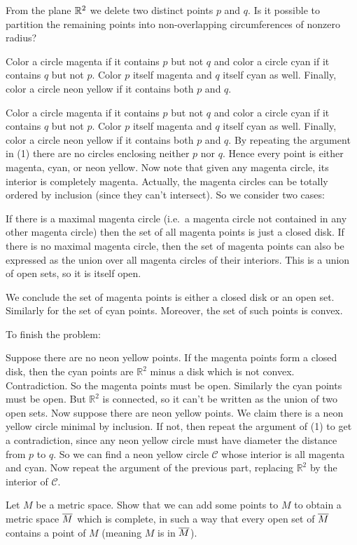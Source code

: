 \begin{problem}
	\yod
	From the plane $\mathbb R^2$ we delete two distinct points $p$ and $q$.
	Is it possible to partition the remaining points into
	non-overlapping circumferences of nonzero radius?
	\begin{hint}
		Color a circle magenta if it contains $p$ but not $q$ and color a circle cyan if it contains $q$ but not $p$. Color $p$ itself magenta and $q$ itself cyan as well. Finally, color a circle neon yellow if it contains both $p$ and $q$. 
	\end{hint}
	\begin{sol}
		Color a circle magenta if it contains $p$ but not $q$ and color a circle cyan if it contains $q$ but not $p$. Color $p$ itself magenta and $q$ itself cyan as well. Finally, color a circle neon yellow if it contains both $p$ and $q$. By repeating the argument in (1) there are no circles enclosing neither $p$ nor $q$. Hence every point is either magenta, cyan, or neon yellow.
		Now note that given any magenta circle, its interior is completely magenta. Actually, the magenta circles can be totally ordered by inclusion (since they can't intersect). So we consider two cases: 
		\begin{itemize}
		 \ii If there is a maximal magenta circle (i.e.\ a magenta circle not contained in any other magenta circle) then the set of all magenta points is just a closed disk.
		 \ii If there is no maximal magenta circle, then the set of magenta points can also be expressed as the union over all magenta circles of their interiors. This is a union of open sets, so it is itself open.
		 \end{itemize}

		We conclude the set of magenta points is either a closed disk or an open set. Similarly for the set of cyan points. Moreover, the set of such points is convex.

		To finish the problem:
		\begin{itemize}
		\ii Suppose there are no neon yellow points. If the magenta points form a closed disk, then the cyan points are $\mathbb R^2$ minus a disk which is not convex. Contradiction. So the magenta points must be open. Similarly the cyan points must be open. But $\mathbb R^2$ is connected, so it can't be written as the union of two open sets.
		\ii Now suppose there are neon yellow points. We claim there is a neon yellow circle minimal by inclusion. If not, then repeat the argument of (1) to get a contradiction, since any neon yellow circle must have diameter the distance from $p$ to $q$. So we can find a neon yellow circle $\mathscr C$ whose interior is all magenta and cyan. Now repeat the argument of the previous part, replacing $\mathbb R^2$ by the interior of $\mathscr C$.
		 \end{itemize}
	\end{sol}
\end{problem}

\begin{dproblem}[Completion]
	\yod
	Let $M$ be a metric space.
	Show that we can add some points to $M$ to obtain a metric space $\overline M$
	which is complete, in such a way that every open set of $\overline M$ contains
	a point of $M$ (meaning $M$ is  in $\overline M$).
\end{dproblem}
